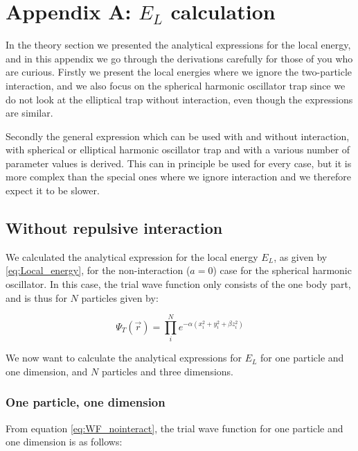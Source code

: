 \documentclass[norsk,a4paper,12pt]{article}
\begin{document}
\newpage

\section{Appendix A: $E_L$ calculation} \label{appendix_A}
In the theory section we presented the analytical expressions for the local energy, and in this appendix we go through the derivations carefully for those of you who are curious. Firstly we present the local energies where we ignore the two-particle interaction, and we also focus on the spherical harmonic oscillator trap since we do not look at the elliptical trap without interaction, even though the expressions are similar.

Secondly the general expression which can be used with and without interaction, with spherical or elliptical harmonic oscillator trap and with a various number of parameter values is derived. This can in principle be used for every case, but it is more complex than the special ones where we ignore interaction and we therefore expect it to be slower. 

\subsection{Without repulsive interaction}
We calculated the analytical expression for the local energy $E_L$, as given by \ref{eq:Local_energy}, for the non-interaction ($a=0$) case for the spherical harmonic oscillator. In this case, the trial wave function only consists of the one body part, and is thus for $N$ particles given by:

\begin{equation}
	\label{eq:WF_nointeract}
	\Psi_T(\vec{r}) = \prod_i^N e^{-\alpha(x_i^2 + y_i^2 + \beta z_i^2)}
\end{equation}

We now want to calculate the analytical expressions for $E_L$ for one particle and one dimension, and $N$ particles and three dimensions.

\subsubsection{One particle, one dimension}

From equation \ref{eq:WF_nointeract}, the trial wave function for one particle and one dimension is as follows:
\end{document}
